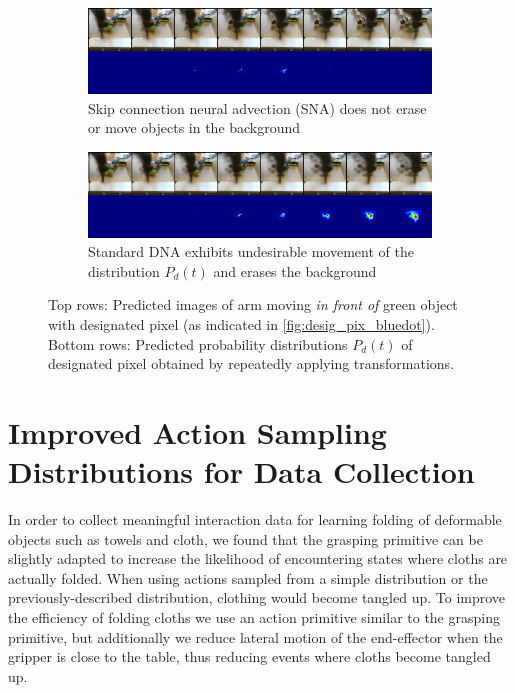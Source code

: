 \begin{figure}
	\centering
	\begin{subfigure}{0.9\columnwidth}
		\centering
		\includegraphics[width=1.\linewidth]{images_sna/occlusionaware/cdna_1ststep_bckgd_gen_pixb0_overtime.png}
		\caption{Skip connection neural advection (SNA) does not erase or move objects in the background}
		\label{fig:Ng1}
	\end{subfigure}
	\begin{subfigure}{0.9\columnwidth}
		\centering
		\includegraphics[width=1.0\linewidth]{images_sna/occlusionaware/orig_dna_gen_pixb0_overtime.png}
		\caption{Standard DNA \cite{foresight} exhibits undesirable movement of the distribution $P_{d}(t)$ and erases the background}
	\end{subfigure}
	\caption{
		Top rows: Predicted images of arm moving \textit{in front of} green object with designated pixel (as indicated in \autoref{fig:desig_pix_bluedot}). 
		Bottom rows: Predicted probability distributions $P_{d}(t)$ of designated pixel obtained by repeatedly applying transformations.}
	\label{fig:pix_reappear}
\end{figure}

\section{Improved Action Sampling Distributions for Data Collection}
\label{sec:folding_sampling}
In order to collect meaningful interaction data for learning folding of deformable objects such as towels and cloth, we found that the grasping primitive can be slightly adapted to increase the likelihood of encountering states where cloths are actually folded. When using actions sampled from a simple distribution or the previously-described distribution, clothing would become tangled up. To improve the efficiency of folding cloths we use an action primitive similar to the grasping primitive, but additionally we reduce lateral motion of the end-effector when the gripper is close to the table, thus reducing events where cloths become tangled up.

